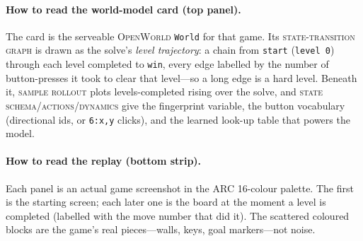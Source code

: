 \documentclass[11pt]{article}
\newcommand{\openworld}{\textsc{OpenWorld}}
\begin{document}
\paragraph{How to read the world-model card (top panel).} The card is the serveable \openworld{}
\texttt{World} for that game. Its \textsc{state-transition graph} is drawn as the solve's \emph{level
trajectory}: a chain from \texttt{start} (\texttt{level 0}) through each level completed to \texttt{win},
every edge labelled by the number of button-presses it took to clear that level---so a long edge is a hard
level. Beneath it, \textsc{sample rollout} plots levels-completed rising over the solve, and
\textsc{state schema}/\textsc{actions}/\textsc{dynamics} give the fingerprint variable, the button
vocabulary (directional ids, or \texttt{6:x,y} clicks), and the learned look-up table that powers the model.

\paragraph{How to read the replay (bottom strip).} Each panel is an actual game screenshot in the ARC
16-colour palette. The first is the starting screen; each later one is the board at the moment a level is
completed (labelled with the move number that did it). The scattered coloured blocks are the game's real
pieces---walls, keys, goal markers---not noise.
\end{document}
